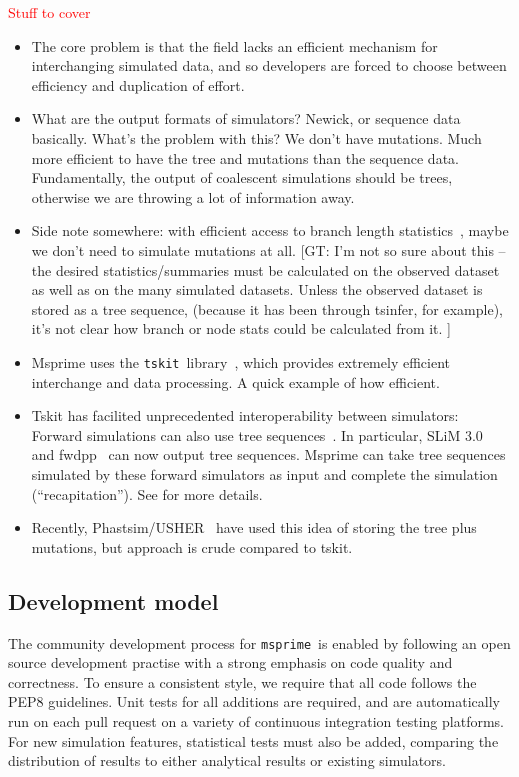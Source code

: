 \documentclass{article}
\newcommand{\msprime}[0]{\texttt{msprime}}
\newcommand{\tskit}[0]{\texttt{tskit}}
\newcommand{\jkcomment}[1]{\textcolor{red}{#1}}
\begin{document}
\jkcomment{Stuff to cover}
\begin{itemize}

\item The core problem is that the field lacks an efficient mechanism for
    interchanging simulated data, and so developers are forced to choose
    between efficiency and duplication of effort.

\item What are the output formats of simulators? Newick, or sequence data
    basically. What's the problem with this? We don't have mutations.
    Much more efficient to have the tree and mutations than the
    sequence data. Fundamentally, the output of coalescent simulations
    should be trees, otherwise we are throwing a lot of information
    away.

\item Side note somewhere: with efficient access to branch length
    statistics~\citep{ralph2019efficiently}, maybe we don't need to
    simulate mutations at all.
[GT: I'm not so sure about this -- the desired statistics/summaries
must be calculated on the observed dataset as well as on the many
simulated datasets.
Unless the observed dataset is stored as a tree sequence,
(because it has been through tsinfer, for example),
it's not clear how branch or node stats could be calculated
from it.
]

\item Msprime uses the \tskit\ library~\citep{tskit2021tskit}, which provides
    extremely efficient interchange and data processing. A quick example
    of how efficient.

\item Tskit has facilited unprecedented interoperability between simulators:
    Forward simulations can also use tree
    sequences~\citep{kelleher2018efficient,haller2018tree}. In particular, SLiM
    3.0~\citep{haller2019slim} and fwdpp~\citep{thornton2014cpp} can now output
    tree sequences. Msprime can take tree sequences simulated by these forward
    simulators as input and complete the simulation (``recapitation'').
    See \cite{haller2018tree} for more details.

\item Recently, Phastsim/USHER~\cite{demaio2021phastsim,turakhia2021ultrafast}
    have used this idea of storing the
    tree plus mutations, but approach is crude compared to tskit.

\end{itemize}

\subsection*{Development model}
The community development process for \msprime\ is enabled by following an
open source development practise with a strong emphasis on code quality
and correctness. To ensure a consistent style, we require that all code
follows the PEP8 guidelines. Unit tests for all additions are required, and
are automatically run on each pull request on a variety of continuous
integration testing platforms. For new simulation features, statistical tests
must also be added, comparing the distribution of results to either analytical
results or existing simulators.
\end{document}
